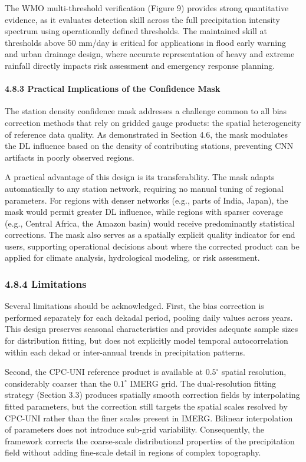 \documentclass[
]{article}
\begin{document}
The WMO multi-threshold verification (Figure 9) provides strong
quantitative evidence, as it evaluates detection skill across the full
precipitation intensity spectrum using operationally defined thresholds.
The maintained skill at thresholds above 50 mm/day is critical for
applications in flood early warning and urban drainage design, where
accurate representation of heavy and extreme rainfall directly impacts
risk assessment and emergency response planning.

\paragraph{4.8.3 Practical Implications of the Confidence
Mask}

The station density confidence mask addresses a challenge common to all
bias correction methods that rely on gridded gauge products: the spatial
heterogeneity of reference data quality. As demonstrated in Section 4.6,
the mask modulates the DL influence based on the density of contributing
stations, preventing CNN artifacts in poorly observed regions.

A practical advantage of this design is its transferability. The mask
adapts automatically to any station network, requiring no manual tuning
of regional parameters. For regions with denser networks (e.g., parts of
India, Japan), the mask would permit greater DL influence, while regions
with sparser coverage (e.g., Central Africa, the Amazon basin) would
receive predominantly statistical corrections. The mask also serves as a
spatially explicit quality indicator for end users, supporting
operational decisions about where the corrected product can be applied
for climate analysis, hydrological modeling, or risk assessment.

\subsubsection{4.8.4 Limitations}\label{limitations}

Several limitations should be acknowledged. First, the bias correction
is performed separately for each dekadal period, pooling daily values
across years. This design preserves seasonal characteristics and
provides adequate sample sizes for distribution fitting, but does not
explicitly model temporal autocorrelation within each dekad or
inter-annual trends in precipitation patterns.

Second, the CPC-UNI reference product is available at \(0.5^{\circ}\)
spatial resolution, considerably coarser than the \(0.1^{\circ}\) IMERG
grid. The dual-resolution fitting strategy (Section 3.3) produces
spatially smooth correction fields by interpolating fitted parameters,
but the correction still targets the spatial scales resolved by CPC-UNI
rather than the finer scales present in IMERG. Bilinear interpolation of
parameters does not introduce sub-grid variability. Consequently, the
framework corrects the coarse-scale distributional properties of the
precipitation field without adding fine-scale detail in regions of
complex topography.
\end{document}
